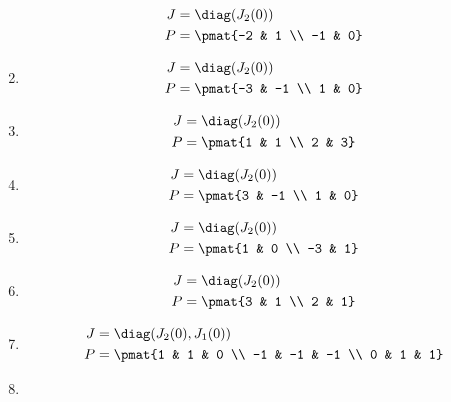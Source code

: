 \begin{enumerate}
\begin{align*}
J &= \diag(J_{2}(0))\\
P &= \pmat{-2 & 1 \\ -1 & 0}
\end{align*}

\item

\begin{align*}
J &= \diag(J_{2}(0))\\
P &= \pmat{-3 & -1 \\ 1 & 0}
\end{align*}

\item

\begin{align*}
J &= \diag(J_{2}(0))\\
P &= \pmat{1 & 1 \\ 2 & 3}
\end{align*}

\item

\begin{align*}
J &= \diag(J_{2}(0))\\
P &= \pmat{3 & -1 \\ 1 & 0}
\end{align*}

\item

\begin{align*}
J &= \diag(J_{2}(0))\\
P &= \pmat{1 & 0 \\ -3 & 1}
\end{align*}

\item

\begin{align*}
J &= \diag(J_{2}(0))\\
P &= \pmat{3 & 1 \\ 2 & 1}
\end{align*}

\item

\begin{align*}
J &= \diag(J_{2}(0), J_{1}(0))\\
P &= \pmat{1 & 1 & 0 \\ -1 & -1 & -1 \\ 0 & 1 & 1}
\end{align*}

\item


\end{enumerate}
